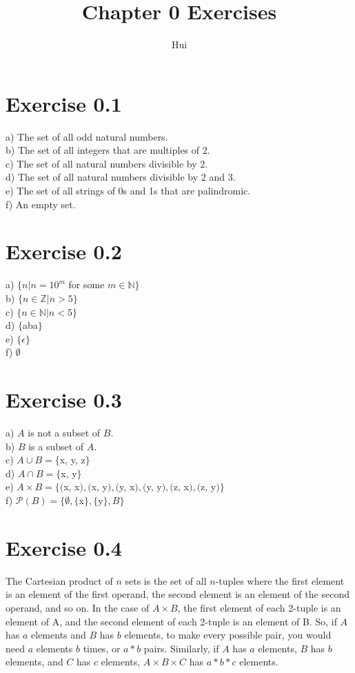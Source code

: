 \documentclass{article}
\begin{document}
\title{Chapter 0 Exercises}
\author{Hui}
\date{}
\maketitle

\section{Exercise 0.1}
a) The set of all odd natural numbers.
\\b) The set of all integers that are multiples of 2.
\\c) The set of all natural numbers divisible by 2.
\\d) The set of all natural numbers divisible by 2 and 3.
\\e) The set of all strings of 0s and 1s that are palindromic.
\\f) An empty set.

\section{Exercise 0.2}
a) $\{ n | n = 10^m$ for some $m\in \mathbb N\}$
\\b) $\{ n\in \mathbb Z | n > 5\}$
\\c) $\{ n\in \mathbb N | n < 5\}$
\\d) $\{$aba$\}$
\\e) $\{\epsilon\}$
\\f) $\emptyset$

\section{Exercise 0.3}
a) $A$ is not a subset of $B$.
\\b) $B$ is a subset of $A$.
\\c) $A \cup B = \{$x, y, z$\}$
\\d) $A \cap B = \{$x, y$\}$
\\e) $A \times B = \{($x, x$), ($x, y$), ($y, x$), ($y, y$), ($z, x$), ($z, y$)\}$
\\f) $\mathcal{P}(B) = \{\emptyset, \{$x$\}, \{$y$\}, B\}$

\section{Exercise 0.4}
The Cartesian product of $n$ sets is the set of all $n$-tuples where the first element is an element of the first operand, the second element is an element of the second operand, and so on. In the case of $A \times B$, the first element of each 2-tuple is an element of A, and the second element of each 2-tuple is an element of B. So, if $A$ has $a$ elements and $B$ has $b$ elements, to make every possible pair, you would need $a$ elements $b$ times, or $a * b$ pairs. Similarly, if $A$ has $a$ elements, $B$ has $b$ elements, and $C$ has $c$ elements, $A \times B \times C$ has $a * b * c$ elements.
\end{document}

